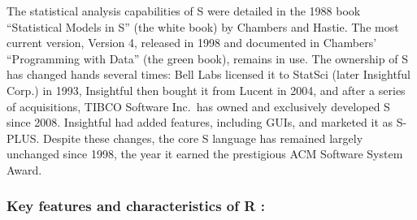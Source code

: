 \documentclass[
]{book}
\begin{document}
The statistical analysis capabilities of S were detailed in the 1988 book ``Statistical Models in S'' (the white book) by Chambers and Hastie. The most current version, Version 4, released in 1998 and documented in Chambers' ``Programming with Data'' (the green book), remains in use. The ownership of S has changed hands several times: Bell Labs licensed it to StatSci (later Insightful Corp.) in 1993, Insightful then bought it from Lucent in 2004, and after a series of acquisitions, TIBCO Software Inc.~has owned and exclusively developed S since 2008. Insightful had added features, including GUIs, and marketed it as S-PLUS. Despite these changes, the core S language has remained largely unchanged since 1998, the year it earned the prestigious ACM Software System Award.

\subsubsection*{Key features and characteristics of R :}\label{key-features-and-characteristics-of-r}
\end{document}
